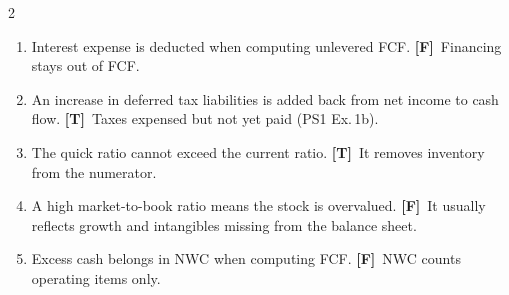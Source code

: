\documentclass[10pt,a4paper]{article}
\newcommand{\T}{\textbf{\color{ok}[T]}~}
\newcommand{\F}{\textbf{\color{wr}[F]}~}
\begin{document}
\begin{multicols}{2}
\begin{enumerate}[label=\arabic*.,leftmargin=1.6em,itemsep=2pt]
        ties up cash in receivables and inventory.
  \item Interest expense is deducted when computing unlevered FCF. \F Financing stays out of FCF.
  \item An increase in deferred tax liabilities is added back from net income to cash flow. \T Taxes
        expensed but not yet paid (PS1 Ex.\,1b).
  \item The quick ratio cannot exceed the current ratio. \T It removes inventory from the numerator.
  \item A high market-to-book ratio means the stock is overvalued. \F It usually reflects growth and
        intangibles missing from the balance sheet.
  \item Excess cash belongs in NWC when computing FCF. \F NWC counts operating items only.
\end{enumerate}


\end{multicols}
\end{document}
